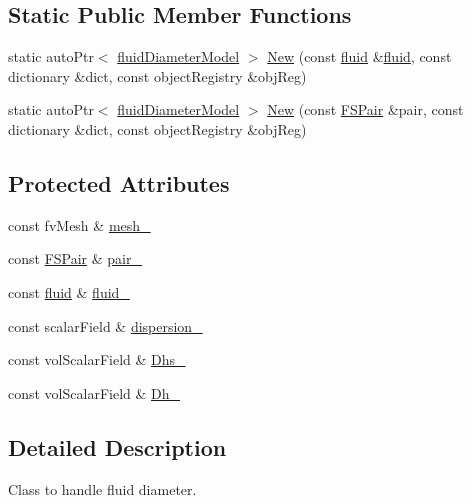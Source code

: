\subsection*{Static Public Member Functions}
\begin{DoxyCompactItemize}
\item 
static auto\+Ptr$<$ \hyperlink{classFoam_1_1fluidDiameterModel}{fluid\+Diameter\+Model} $>$ \hyperlink{classFoam_1_1fluidDiameterModel_a6f22fb248e45888d4afe527f6e17e593}{New} (const \hyperlink{classFoam_1_1fluid}{fluid} \&\hyperlink{classFoam_1_1fluid}{fluid}, const dictionary \&dict, const object\+Registry \&obj\+Reg)
\item 
static auto\+Ptr$<$ \hyperlink{classFoam_1_1fluidDiameterModel}{fluid\+Diameter\+Model} $>$ \hyperlink{classFoam_1_1fluidDiameterModel_a82a20d6b34a97bdca678c50daddf7de9}{New} (const \hyperlink{classFoam_1_1FSPair}{F\+S\+Pair} \&pair, const dictionary \&dict, const object\+Registry \&obj\+Reg)
\end{DoxyCompactItemize}
\subsection*{Protected Attributes}
\begin{DoxyCompactItemize}
\item 
const fv\+Mesh \& \hyperlink{classFoam_1_1fluidDiameterModel_a23edeeeecebcef11921a33dd5d990570}{mesh\+\_\+}
\item 
const \hyperlink{classFoam_1_1FSPair}{F\+S\+Pair} \& \hyperlink{classFoam_1_1fluidDiameterModel_a587e19a1b4f4b498d2604d20c093a73b}{pair\+\_\+}
\item 
const \hyperlink{classFoam_1_1fluid}{fluid} \& \hyperlink{classFoam_1_1fluidDiameterModel_aef274d0faea6f388e2907dc335349bc9}{fluid\+\_\+}
\item 
const scalar\+Field \& \hyperlink{classFoam_1_1fluidDiameterModel_a8fa76190053050d68abc04479f2c54e0}{dispersion\+\_\+}
\item 
const vol\+Scalar\+Field \& \hyperlink{classFoam_1_1fluidDiameterModel_a8891c9fe98566d620d631ac0d6687060}{Dhs\+\_\+}
\item 
const vol\+Scalar\+Field \& \hyperlink{classFoam_1_1fluidDiameterModel_a9f354183d629b4422e533a56df9634a4}{Dh\+\_\+}
\end{DoxyCompactItemize}


\subsection{Detailed Description}
Class to handle fluid diameter. 

